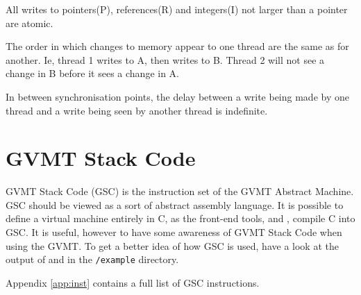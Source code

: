 All writes to pointers(P), references(R) and integers(I) not larger than a pointer are atomic.


The order in which changes to memory appear to one thread are the same as for another. Ie, thread 1 writes to A, then writes to B. Thread 2 will not see a change in B before it sees a change in A.


In between synchronisation points, the delay between a write being made by one thread and a write being seen by another thread is indefinite.

\section{GVMT Stack Code}
GVMT Stack Code (GSC) is the instruction set of the GVMT Abstract Machine.
GSC should be viewed as a sort of abstract assembly language. It is possible to define a virtual machine entirely in C, as the front-end tools, \gvmtic{} and \gvmtc, compile C into GSC.
It is useful, however to have some awareness of GVMT Stack Code when using the GVMT.
To get a better idea of how GSC is used, have a look at the output of \gvmtc and \gvmtic in the \verb|/example| directory.

Appendix \ref{app:inst} contains a full list of GSC instructions.
